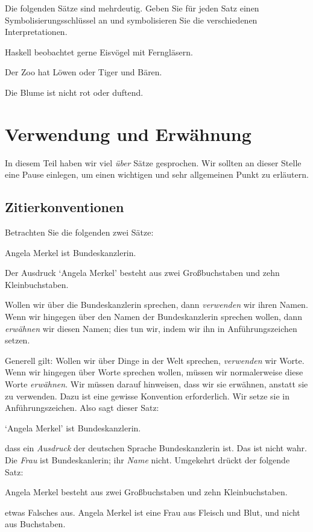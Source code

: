 \practiceproblems
\solutions
\problempart 
Die folgenden Sätze sind mehrdeutig. Geben Sie für jeden Satz einen Symbolisierungsschlüssel an und symbolisieren Sie die verschiedenen Interpretationen.
\begin{earg}
	\item Haskell beobachtet gerne Eisvögel mit Ferngläsern.
	\item Der Zoo hat Löwen oder Tiger und Bären.
	\item Die Blume ist nicht rot oder duftend.
\end{earg}

\chapter{Verwendung und Erwähnung}\label{s:UseMention}
In diesem Teil haben wir viel \emph{über} Sätze gesprochen. Wir sollten an dieser Stelle eine Pause einlegen, um einen wichtigen und sehr allgemeinen Punkt zu erläutern.

\section{Zitierkonventionen}
Betrachten Sie die folgenden zwei Sätze:
	\begin{ebullet}
		\item Angela Merkel ist Bundeskanzlerin.
		\item Der Ausdruck `Angela Merkel' besteht aus zwei Gro{\ss}buchstaben und zehn Kleinbuchstaben.
	\end{ebullet}
Wollen wir über die Bundeskanzlerin sprechen, dann \emph{verwenden} wir ihren Namen. Wenn wir hingegen über den Namen der Bundeskanzlerin sprechen wollen, dann \emph{erwähnen} wir diesen Namen; dies tun wir, indem wir ihn in Anführungszeichen setzen.

Generell gilt: Wollen wir über Dinge in der Welt sprechen, \emph{verwenden} wir Worte. Wenn wir hingegen über Worte sprechen wollen, müssen wir normalerweise diese Worte \emph{erwähnen}. Wir müssen darauf hinweisen, dass wir sie erwähnen, anstatt sie zu verwenden. Dazu ist eine gewisse Konvention erforderlich. Wir setze sie in Anführungszeichen. Also sagt dieser Satz:
	\begin{ebullet}
		\item `Angela Merkel' ist Bundeskanzlerin.
	\end{ebullet}
dass ein \emph{Ausdruck} der deutschen Sprache Bundeskanzlerin ist. Das ist nicht wahr. Die \emph{Frau} ist Bundeskanlerin; ihr \emph{Name} nicht. Umgekehrt drückt der folgende Satz:
	\begin{ebullet}
		\item Angela Merkel besteht aus zwei Gro{\ss}buchstaben und zehn Kleinbuchstaben.
	\end{ebullet}
etwas Falsches aus. Angela Merkel ist eine Frau aus Fleisch und Blut, und nicht aus Buchstaben. 

